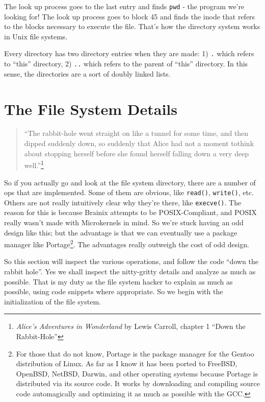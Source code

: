 \documentclass{article}
\begin{document}
The look up process goes to the last entry and finds \verb|pwd| - the program we're looking for! The look up process goes to block 45 and finds the inode that refers to the blocks necessary to execute the file. That's how the directory system works in Unix file systems.

Every directory has two directory entries when they are made: 1) \verb|.| which refers to ``this'' directory, 2) \verb|..| which refers to the parent of ``this'' directory. In this sense, the directories are a sort of doubly linked lists.

\section{The File System Details}

\begin{quote}
``The rabbit-hole went straight on like a tunnel for some time, and then dipped suddenly down, so suddenly that Alice had not a moment tothink about stopping herself before she found herself falling down a very deep well.''\footnote{\textit{Alice's Adventures in Wonderland} by Lewis Carroll, chapter 1 ``Down the Rabbit-Hole''}
\end{quote}

So if you actually go and look at the file system directory, there are a number of ops that are implemented. Some of them are obvious, like \verb|read()|, \verb|write()|, etc. Others are not really intuitively clear why they're there, like \verb|execve()|. The reason for this is because Brainix attempts to be POSIX-Compliant, and POSIX really wasn't made with Microkernels in mind. So we're stuck having an odd design like this; but the advantage is that we can eventually use a package manager like Portage\footnote{For those that do not know, Portage is the package manager for the Gentoo distribution of Linux. As far as I know it has been ported to FreeBSD, OpenBSD, NetBSD, Darwin, and other operating systems because Portage is distributed via its source code. It works by downloading and compiling source code automagically and optimizing it as much as possible with the GCC.}. The advantages really outweigh the cost of odd design.

So this section will inspect the various operations, and follow the code ``down the rabbit hole''. Yes we shall inspect the nitty-gritty details and analyze as much as possible. That is my duty as the file system hacker to explain as much as possible, using code snippets where appropriate. So we begin with the initialization of the file system.
\end{document}
